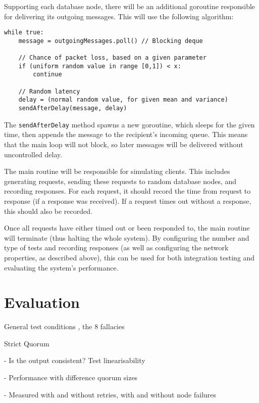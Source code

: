 \documentclass[12pt,a4paper,twoside,openright]{report}
\begin{document}
Supporting each database node, there will be an additional goroutine responsible for delivering its outgoing messages. This will use the following algorithm:

\begin{lstlisting}
while true:
    message = outgoingMessages.poll() // Blocking deque

    // Chance of packet loss, based on a given parameter
    if (uniform random value in range [0,1]) < x:
        continue

    // Random latency
    delay = (normal random value, for given mean and variance)
    sendAfterDelay(message, delay)
\end{lstlisting}

The \verb|sendAfterDelay| method spawns a new goroutine, which sleeps for the given time, then appends the message to the recipient's incoming queue. This means that the main loop will not block, so later messages will be delivered without uncontrolled delay.

The main routine will be responsible for simulating clients. This includes generating requests, sending these requests to random database nodes, and recording responses. For each request, it should record the time from request to response (if a response was received). If a request times out without a response, this should also be recorded.

Once all requests have either timed out or been responded to, the main routine will terminate (thus halting the whole system). By configuring the number and type of tests and recording responses (as well as configuring the network properties, as described above), this can be used for both integration testing and evaluating the system's performance.


\chapter{Evaluation}

General test conditions \cite{nunemaker}, the 8 fallacies %

Strict Quorum

- Is the output consistent? Test linearisability \cite{herlihy1990linearizability}

- Performance with difference quorum sizes

- Measured with and without retries, with and without node failures
\end{document}

